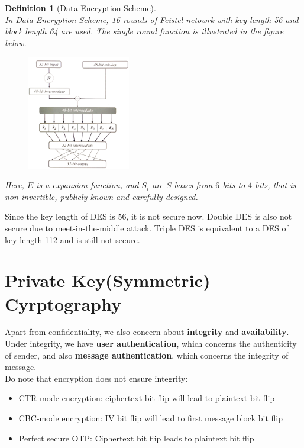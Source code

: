 \documentclass[12pt]{article}
\newtheorem{definition}{Definition}[section]
\theoremstyle{definition}
\begin{document}
\begin{definition}[Data Encryption Scheme]
\hfill\\\normalfont In Data Encryption Scheme, 16 rounds of Feistel netowrk with key length 56 and block length 64 are used. The single round function is illustrated in the figure below.
\begin{figure}[h]
\centering
\includegraphics[width=0.4\textwidth]{3.png}
\end{figure}
Here, $E$ is a expansion function, and $S_i$ are $S$ boxes from $6$ bits to $4$ bits, that is non-invertible, publicly known and carefully designed. 
\end{definition}
Since the key length of DES is 56, it is not secure now. Double DES is also not secure due to meet-in-the-middle attack. Triple DES is equivalent to a DES of key length 112 and is still not secure.

\section{Private Key(Symmetric) Cyrptography}
Apart from confidentiality, we also concern about \textbf{integrity} and \textbf{availability}. Under integrity, we have \textbf{user authentication}, which concerns the authenticity of sender, and also \textbf{message authentication}, which concerns the integrity of message.\\Do note that encryption does not ensure integrity:
\begin{itemize}
  \item CTR-mode encryption: ciphertext bit flip will lead to plaintext bit flip
  \item CBC-mode encryption: IV bit flip will lead to first message block bit flip
  \item Perfect secure OTP: Ciphertext bit flip leads to plaintext bit flip
\end{itemize}
\end{document}
